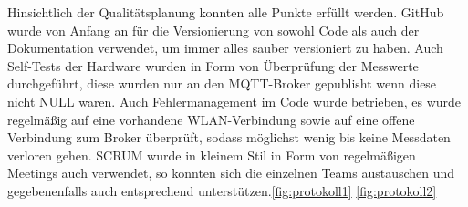 Hinsichtlich der Qualitätsplanung konnten alle Punkte erfüllt werden.
GitHub wurde von Anfang an für die Versionierung von sowohl Code als auch der Dokumentation verwendet, um immer alles sauber versioniert zu haben. \newline
Auch Self-Tests der Hardware wurden in Form von Überprüfung der Messwerte durchgeführt, diese wurden nur an den MQTT-Broker gepublisht wenn diese nicht NULL waren.\newline
Auch Fehlermanagement im Code wurde betrieben, es wurde regelmäßig auf eine vorhandene WLAN-Verbindung sowie auf eine offene Verbindung zum Broker überprüft, sodass möglichst wenig bis keine Messdaten verloren gehen. \newline
SCRUM wurde in kleinem Stil in Form von regelmäßigen Meetings auch verwendet, so konnten sich die einzelnen Teams austauschen und gegebenenfalls auch entsprechend unterstützen.\ref{fig:protokoll1} \ref{fig:protokoll2}